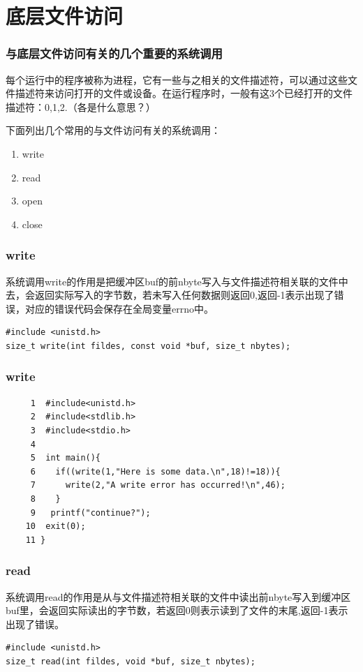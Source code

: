\documentclass{beamer}
\begin{document}
\section{底层文件访问}
\begin{frame}
\frametitle{与底层文件访问有关的几个重要的系统调用}
每个运行中的程序被称为进程，它有一些与之相关的文件描述符，可以通过这些文件描述符来访问打开的文件或设备。在运行程序时，一般有这3个已经打开的文件描述符：0,1,2.（各是什么意思？）

下面列出几个常用的与文件访问有关的系统调用：
\begin{enumerate}
\item
write
\item
read
\item
open
\item
close


\end{enumerate}


\end{frame}
\begin{frame}[fragile]
\frametitle{write}
系统调用write的作用是把缓冲区buf的前nbyte写入与文件描述符相关联的文件中去，会返回实际写入的字节数，若未写入任何数据则返回0,返回-1表示出现了错误，对应的错误代码会保存在全局变量errno中。
\begin{example}[write系统调用的原型]
\begin{verbatim}
#include <unistd.h>
size_t write(int fildes, const void *buf, size_t nbytes);
\end{verbatim}
\end{example}

\end{frame}



\begin{frame}[fragile]
\frametitle{write}
\begin{example}[write系统调用的使用实例]
\begin{verbatim}
     1  #include<unistd.h>
     2  #include<stdlib.h>
     3  #include<stdio.h>
     4
     5  int main(){
     6    if((write(1,"Here is some data.\n",18)!=18)){
     7      write(2,"A write error has occurred!\n",46);
     8    }
     9   printf("continue?");
    10  exit(0);
    11 }
\end{verbatim}
\end{example}

\end{frame}

\begin{frame}[fragile]
\frametitle{read}
系统调用read的作用是从与文件描述符相关联的文件中读出前nbyte写入到缓冲区buf里，会返回实际读出的字节数，若返回0则表示读到了文件的末尾,返回-1表示出现了错误。
\begin{example}[read系统调用的原型]
\begin{verbatim}
#include <unistd.h>
size_t read(int fildes, void *buf, size_t nbytes);
\end{verbatim}
\end{example}

\end{frame}
\end{document}
